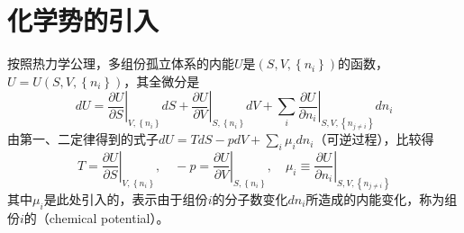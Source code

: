 \documentclass[main.tex]{subfiles}
\begin{document}
\section{化学势的引入}
按照热力学公理，多组份孤立体系的内能$U$是$\left(S, V,\left\{n_i\right\}\right)$的函数，$U=U\left(S,V,\left\{n_i\right\}\right)$，其全微分是
\[dU=\left.\frac{\partial U}{\partial S}\right|_{V,\left\{n_i\right\}}dS+\left.\frac{\partial U}{\partial V}\right|_{S,\left\{n_i\right\}}dV+\sum_i\left.\frac{\partial U}{\partial n_i}\right|_{S,V,\left\{n_{j\neq i}\right\}}dn_i\]
由第一、二定律得到的式子$dU=TdS-pdV+\sum_i\mu_idn_i$（可逆过程），比较得
\[T=\left.\frac{\partial U}{\partial S}\right|_{V,\left\{n_i\right\}},\quad-p=\left.\frac{\partial U}{\partial V}\right|_{S,\left\{n_i\right\}},\quad\mu_i\equiv\left.\frac{\partial U}{\partial n_i}\right|_{S,V,\left\{n_{j\neq i}\right\}}\]
其中$\mu_i$是此处引入的，表示由于组份$i$的分子数变化$dn_i$所造成的内能变化，称为组份$i$的（chemical potential）。
\end{document}
